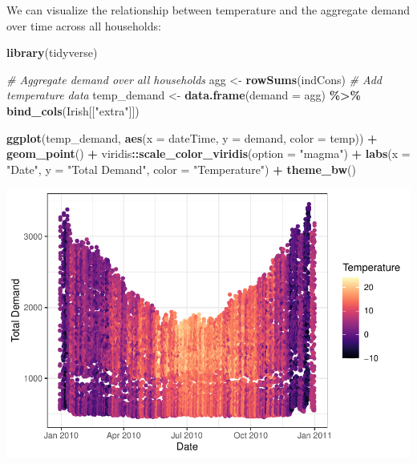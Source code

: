 \documentclass[
]{article}
\newenvironment{Shaded}{\begin{snugshade}}{\end{snugshade}}
\newcommand{\AttributeTok}[1]{\textcolor[rgb]{0.13,0.29,0.53}{#1}}
\newcommand{\CommentTok}[1]{\textcolor[rgb]{0.56,0.35,0.01}{\textit{#1}}}
\newcommand{\FunctionTok}[1]{\textcolor[rgb]{0.13,0.29,0.53}{\textbf{#1}}}
\newcommand{\NormalTok}[1]{#1}
\newcommand{\OtherTok}[1]{\textcolor[rgb]{0.56,0.35,0.01}{#1}}
\newcommand{\SpecialCharTok}[1]{\textcolor[rgb]{0.81,0.36,0.00}{\textbf{#1}}}
\newcommand{\StringTok}[1]{\textcolor[rgb]{0.31,0.60,0.02}{#1}}
\begin{document}
We can visualize the relationship between temperature and the aggregate
demand over time across all households:

\begin{Shaded}
\begin{Highlighting}[]
\FunctionTok{library}\NormalTok{(tidyverse)}

\CommentTok{\# Aggregate demand over all households}
\NormalTok{agg }\OtherTok{\textless{}{-}} \FunctionTok{rowSums}\NormalTok{(indCons)}
\CommentTok{\# Add temperature data}
\NormalTok{temp\_demand }\OtherTok{\textless{}{-}} \FunctionTok{data.frame}\NormalTok{(}\AttributeTok{demand =}\NormalTok{ agg) }\SpecialCharTok{\%\textgreater{}\%}
  \FunctionTok{bind\_cols}\NormalTok{(Irish[[}\StringTok{"extra"}\NormalTok{]])}

\FunctionTok{ggplot}\NormalTok{(temp\_demand, }\FunctionTok{aes}\NormalTok{(}\AttributeTok{x =}\NormalTok{ dateTime, }\AttributeTok{y =}\NormalTok{ demand, }\AttributeTok{color =}\NormalTok{ temp)) }\SpecialCharTok{+}
  \FunctionTok{geom\_point}\NormalTok{() }\SpecialCharTok{+}
\NormalTok{  viridis}\SpecialCharTok{::}\FunctionTok{scale\_color\_viridis}\NormalTok{(}\AttributeTok{option =} \StringTok{"magma"}\NormalTok{) }\SpecialCharTok{+}
  \FunctionTok{labs}\NormalTok{(}\AttributeTok{x =} \StringTok{"Date"}\NormalTok{, }\AttributeTok{y =} \StringTok{"Total Demand"}\NormalTok{, }\AttributeTok{color =} \StringTok{"Temperature"}\NormalTok{) }\SpecialCharTok{+}
  \FunctionTok{theme\_bw}\NormalTok{()}
\end{Highlighting}
\end{Shaded}

\includegraphics{main_files/figure-latex/unnamed-chunk-4-1.pdf}
\end{document}
